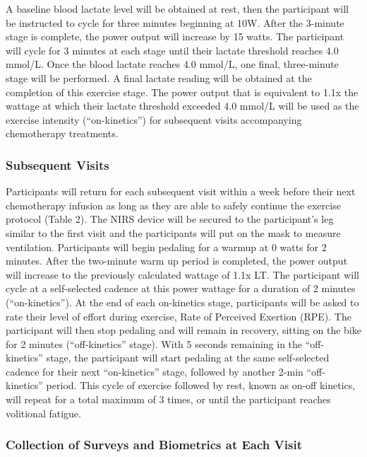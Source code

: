 \documentclass[
]{book}
\begin{document}
A baseline blood lactate level will be obtained at rest, then the participant will be instructed to cycle for three minutes beginning at 10W. After the 3-minute stage is complete, the power output will increase by 15 watts. The participant will cycle for 3 minutes at each stage until their lactate threshold reaches 4.0 mmol/L. Once the blood lactate reaches 4.0 mmol/L, one final, three-minute stage will be performed. A final lactate reading will be obtained at the completion of this exercise stage. The power output that is equivalent to 1.1x the wattage at which their lactate threshold exceeded 4.0 mmol/L will be used as the exercise intensity (``on-kinetics'') for subsequent visits accompanying chemotherapy treatments.

\hypertarget{Appendix-IRB-Protocol-StudyProtocol-SubsequentVisits}{%
\subsubsection{Subsequent Visits}\label{Appendix-IRB-Protocol-StudyProtocol-SubsequentVisits}}

Participants will return for each subsequent visit within a week before their next chemotherapy infusion as long as they are able to safely continue the exercise protocol (Table 2). The NIRS device will be secured to the participant's leg similar to the first visit and the participants will put on the mask to measure ventilation. Participants will begin pedaling for a warmup at 0 watts for 2 minutes. After the two-minute warm up period is completed, the power output will increase to the previously calculated wattage of 1.1x LT. The participant will cycle at a self-selected cadence at this power wattage for a duration of 2 minutes (``on-kinetics''). At the end of each on-kinetics stage, participants will be asked to rate their level of effort during exercise, Rate of Perceived Exertion (RPE). The participant will then stop pedaling and will remain in recovery, sitting on the bike for 2 minutes (``off-kinetics'' stage). With 5 seconds remaining in the ``off-kinetics'' stage, the participant will start pedaling at the same self-selected cadence for their next ``on-kinetics'' stage, followed by another 2-min ``off-kinetics'' period. This cycle of exercise followed by rest, known as on-off kinetics, will repeat for a total maximum of 3 times, or until the participant reaches volitional fatigue.

\hypertarget{Appendix-IRB-Protocol-StudyProtocol-Surveys}{%
\subsubsection{Collection of Surveys and Biometrics at Each Visit}\label{Appendix-IRB-Protocol-StudyProtocol-Surveys}}
\end{document}
